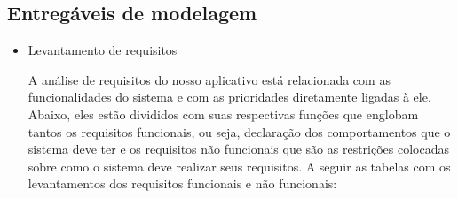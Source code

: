 \subsection{Entregáveis de modelagem}
\begin{itemize}
    \item Levantamento de requisitos
    
    A análise de requisitos do nosso aplicativo está relacionada com as funcionalidades do sistema e com as prioridades diretamente ligadas à ele. Abaixo, eles estão divididos com suas respectivas funções que englobam tantos os requisitos funcionais, ou seja, declaração dos comportamentos que o sistema deve ter e os requisitos não funcionais que são as restrições colocadas sobre como o sistema deve realizar seus requisitos.
    A seguir as tabelas com os levantamentos dos requisitos funcionais e não funcionais:


\end{itemize}
